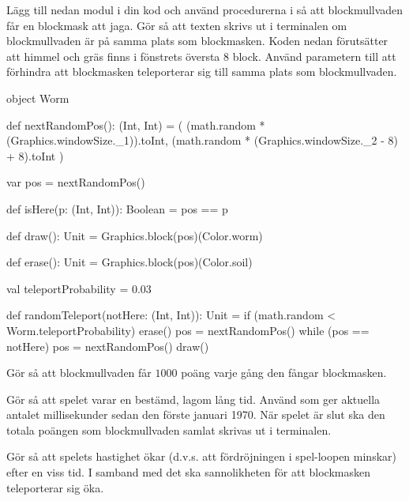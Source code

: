 \Subtask Lägg till nedan modul i din kod och använd procedurerna i  så att blockmullvaden får en blockmask att jaga. Gör så att texten  skrivs ut i terminalen om blockmullvaden är på samma plats som blockmasken. Koden nedan förutsätter att himmel och gräs finns i fönstrets översta $8$ block. Använd parametern  till att förhindra att blockmasken teleporterar sig till samma plats som blockmullvaden.

\begin{Code}
object Worm {
  def nextRandomPos(): (Int, Int) =
    ( (math.random * (Graphics.windowSize._1)).toInt,
      (math.random * (Graphics.windowSize._2 - 8) + 8).toInt )

  var pos = nextRandomPos()

  def isHere(p: (Int, Int)): Boolean = pos == p

  def draw(): Unit  = Graphics.block(pos)(Color.worm)

  def erase(): Unit = Graphics.block(pos)(Color.soil)

  val teleportProbability = 0.03

  def randomTeleport(notHere: (Int, Int)): Unit =
    if (math.random < Worm.teleportProbability) {
      erase()
      pos = nextRandomPos()
      while (pos == notHere) pos = nextRandomPos()
      draw()
    }
}
\end{Code}

\Subtask Gör så att blockmullvaden får $1000$ poäng varje gång den fångar blockmasken.

\Subtask Gör så att spelet varar en bestämd, lagom lång tid. Använd  som ger aktuella antalet millisekunder sedan den förste januari 1970. När spelet är slut ska den totala poängen som blockmullvaden samlat skrivas ut i terminalen.

\Subtask Gör så att spelets hastighet ökar (d.v.s. att fördröjningen i spel-loopen minskar) efter en viss tid. I samband med det ska sannolikheten för att blockmasken teleporterar sig öka.
